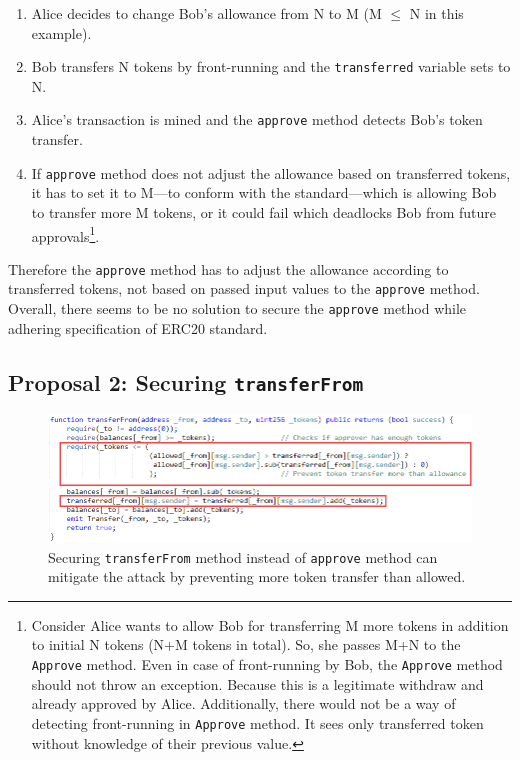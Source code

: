 \begin{enumerate}
	\item Alice decides to change Bob's allowance from N to M (M $\leq$ N in this example).
	\item Bob transfers N tokens by front-running and the \texttt{transferred} variable sets to N.
	\item Alice's transaction is mined and the \texttt{approve} method detects Bob's token transfer.
	\item If \texttt{approve} method does not adjust the allowance based on transferred tokens, it has to set it to M---to conform with the standard---which is allowing Bob to transfer more M tokens, or it could fail which deadlocks Bob from future approvals\footnote{Consider Alice wants to allow Bob for transferring M more tokens in addition to initial N tokens (N+M tokens in total). So, she passes M+N to the \texttt{Approve} method. Even in case of front-running by Bob, the \texttt{Approve} method should not throw an exception. Because this is a legitimate withdraw and already approved by Alice. Additionally, there would not be a way of detecting front-running in \texttt{Approve} method. It sees only transferred token without knowledge of their previous value.}.
\end{enumerate}

Therefore the \texttt{approve} method has to adjust the allowance according to transferred tokens, not based on passed input values to the \texttt{approve} method. Overall, there seems to be no solution to secure the \texttt{approve} method while adhering specification of ERC20 standard.


\subsection{Proposal 2: Securing \texttt{transferFrom}}\label{sec:proposal2}

\begin{figure}[t]
	\centering
	\includegraphics[width=1.0\linewidth]{figures/multiple_withdrawal_31.png}
	\caption{Securing \texttt{transferFrom} method instead of \texttt{approve} method can mitigate the attack by preventing more token transfer than allowed.\label{fig:transfer2}}
\end{figure}

